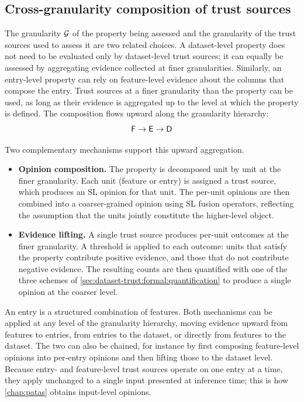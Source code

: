 \subsection{Cross-granularity composition of trust sources}
\label{sec:dataset-trust:formal:granularity}

The granularity $\mathcal{G}$ of the property being assessed and the granularity of the trust sources used to assess it are two related choices. A dataset-level property does not need to be evaluated only by dataset-level trust sources; it can equally be assessed by aggregating evidence collected at finer granularities. Similarly, an entry-level property can rely on feature-level evidence about the columns that compose the entry. Trust sources at a finer granularity than the property can be used, as long as their evidence is aggregated up to the level at which the property is defined. The composition flows upward along the granularity hierarchy:
\[\textsf{F} \to \textsf{E} \to \textsf{D}\]

Two complementary mechanisms support this upward aggregation.
\begin{itemize}
    \item \textbf{Opinion composition.} The property is decomposed unit by unit at the finer granularity. Each unit (feature or entry) is assigned a trust source, which produces an \ac{SL} opinion for that unit. The per-unit opinions are then combined into a coarser-grained opinion using \ac{SL} fusion operators, reflecting the assumption that the units jointly constitute the higher-level object.

    \item \textbf{Evidence lifting.} A single trust source produces per-unit outcomes at the finer granularity. A threshold is applied to each outcome: units that satisfy the property contribute positive evidence, and those that do not contribute negative evidence. The resulting counts are then quantified with one of the three schemes of \cref{sec:dataset-trust:formal:quantification} to produce a single opinion at the coarser level.
\end{itemize}
\noindent An entry is a structured combination of features. Both mechanisms can be applied at any level of the granularity hierarchy, moving evidence upward from features to entries, from entries to the dataset, or directly from features to the dataset. The two can also be chained, for instance by first composing feature-level opinions into per-entry opinions and then lifting those to the dataset level. Because entry- and feature-level trust sources operate on one entry at a time, they apply unchanged to a single input presented at inference time; this is how \cref{chap:patas} obtains input-level opinions.

